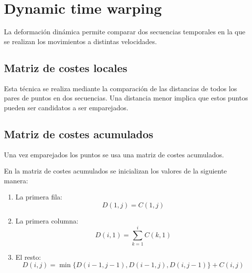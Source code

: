 \section{Dynamic time warping}
La deformación dinámica permite comparar dos secuencias temporales en la que se realizan los movimientos a distintas velocidades.


\subsection{Matriz de costes locales}
Esta técnica se realiza mediante la comparación de las distancias de todos los pares de puntos en dos secuencias. Una distancia menor implica que estos puntos pueden ser candidatos a ser emparejados. \cite{dwt:dwtdescription}


\subsection{Matriz de costes acumulados}
Una vez emparejados los puntos se usa una matriz de costes acumulados.\cite{s19132882}

En la matriz de costes acumulados se inicializan los valores de la siguiente manera:
\begin{enumerate}
	\item  La primera fila:
	\begin{equation}
		D(1,j) = C(1,j)
	\end{equation}
	\item La primera columna:
	\begin{equation}
		D(i,1) = \sum_{k=1}^{i}C(k,1)
	\end{equation} 
	\item El resto:
	\begin{equation}
		D(i,j) = \min\{D(i-1, j-1),D(i-1,j),D(i,j-1)\} + C(i,j)
	\end{equation}
\end{enumerate}